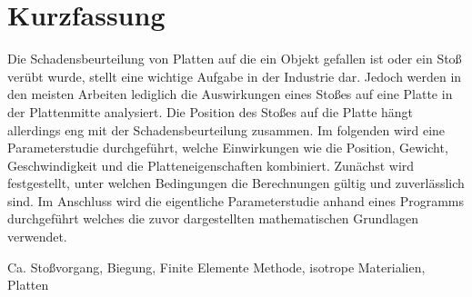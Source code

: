 \chapter*{Kurzfassung} 


Die Schadensbeurteilung von Platten auf die ein Objekt gefallen ist oder ein Stoß verübt wurde, stellt eine wichtige Aufgabe in der Industrie dar. Jedoch werden in den meisten Arbeiten lediglich die Auswirkungen eines Stoßes auf eine Platte in der Plattenmitte analysiert. Die Position des Stoßes auf die Platte hängt allerdings eng mit der Schadensbeurteilung zusammen. Im folgenden wird eine Parameterstudie durchgeführt, welche Einwirkungen wie die Position, Gewicht, Geschwindigkeit und die Platteneigenschaften kombiniert. Zunächst wird festgestellt, unter welchen Bedingungen die Berechnungen gültig und zuverlässlich sind. Im Anschluss wird die eigentliche Parameterstudie anhand eines Programms durchgeführt welches die zuvor dargestellten mathematischen Grundlagen verwendet.

\begin{keywords}
Ca. Stoßvorgang, Biegung, Finite Elemente Methode, isotrope Materialien, Platten
\end{keywords}